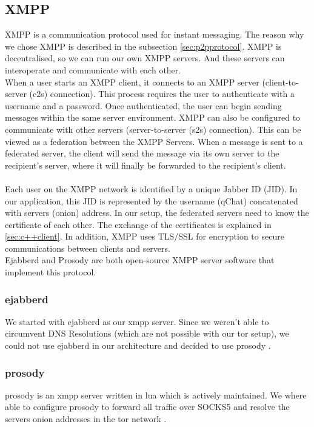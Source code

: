 \subsection{XMPP}
XMPP \cite{xmpp2023website} is a communication protocol used for instant messaging. The reason why we chose XMPP is described in the subsection \ref{sec:p2pprotocol}.
XMPP is decentralised, so we can run our own XMPP servers. And these servers can interoperate and communicate with each other. \\

When a user starts an XMPP client, it connects to an XMPP server (client-to-server (c2s) connection). This process requires the user to authenticate with a username and a password.
Once authenticated, the user can begin sending messages within the same server environment. XMPP can also be configured to communicate with other servers (server-to-server (s2s) connection). This can be viewed as a federation between the XMPP Servers. When a message is sent to a federated server, the client will send the message via its own server to the recipient's server, where it will finally be forwarded to the recipient's client. \\ \\
Each user on the XMPP network is identified by a unique Jabber ID (JID). In our application, this JID is represented by the username (qChat) concatenated with servers (onion) address. In our setup, the federated servers need to know the certificate of each other. The exchange of the certificates is explained in \ref{sec:c++client}. In addition, XMPP uses TLS/SSL for encryption to secure communications between clients and servers. \\

Ejabberd and Prosody are both open-source XMPP server software that implement this protocol.

\subsubsection{ejabberd}
We started with ejabberd as our xmpp server. Since we weren't able to circumvent DNS Resolutions (which are not possible with our tor setup), we could not use ejabberd in our architecture and decided to use prosody \cite{ejabberddocs}.

\subsubsection{prosody}
prosody is an xmpp server written in lua which is actively maintained. We where able to configure prosody to forward all traffic over SOCKS5 and resolve the servers onion addresses in the tor network \cite{prosodydocs}.



